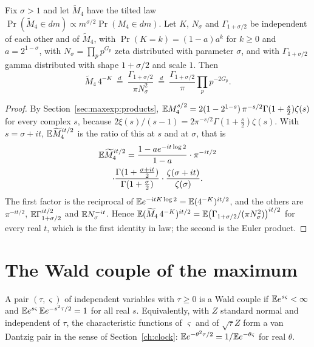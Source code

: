 \begin{theorem}\label{mw:thm:khinchin}
Fix $\sigma>1$ and let $\widetilde M_4$ have the tilted law $\Pr(\widetilde M_4\in dm)\propto m^{\sigma/2}\Pr(M_4\in dm)$. Let $K$, $N_\sigma$ and $\Gamma_{1+\sigma/2}$ be independent of each other and of $\widetilde M_4$, with $\Pr(K=k)=(1-a)a^k$ for $k\ge0$ and $a=2^{1-\sigma}$, with $N_\sigma=\prod_pp^{G_p}$ zeta distributed with parameter $\sigma$, and with $\Gamma_{1+\sigma/2}$ gamma distributed with shape $1+\sigma/2$ and scale $1$. Then
\[
\widetilde M_4\,4^{-K}\ \stackrel{d}{=}\ \frac{\Gamma_{1+\sigma/2}}{\pi N_\sigma^2}\ \stackrel{d}{=}\ \frac{\Gamma_{1+\sigma/2}}{\pi}\prod_pp^{-2G_p}.
\]
\end{theorem}

\begin{proof}
By Section~\ref{sec:maxexp:products}, $\mathbb{E} M_4^{s/2}=2(1-2^{1-s})\,\pi^{-s/2}\Gamma(1+\frac s2)\zeta(s)$ for every complex $s$, because $2\xi(s)/(s-1)=2\pi^{-s/2}\Gamma(1+\frac s2)\zeta(s)$. With $s=\sigma+it$, $\mathbb{E}\widetilde M_4^{it/2}$ is the ratio of this at $s$ and at $\sigma$, that is
\begin{multline*}
\mathbb{E}\widetilde M_4^{it/2}=\frac{1-ae^{-it\log2}}{1-a}\cdot\pi^{-it/2}\\
\cdot\frac{\Gamma(1+\frac{\sigma+it}2)}{\Gamma(1+\frac\sigma2)}\cdot\frac{\zeta(\sigma+it)}{\zeta(\sigma)}.
\end{multline*}
The first factor is the reciprocal of $\mathbb{E} e^{-itK\log2}=\mathbb{E}(4^{-K})^{it/2}$, and the others are $\pi^{-it/2}$, $\mathbb{E}\Gamma_{1+\sigma/2}^{it/2}$ and $\mathbb{E} N_\sigma^{-it}$. Hence $\mathbb{E}(\widetilde M_4\,4^{-K})^{it/2}=\mathbb{E}\bigl(\Gamma_{1+\sigma/2}/(\pi N_\sigma^2)\bigr)^{it/2}$ for every real $t$, which is the first identity in law; the second is the Euler product.
\end{proof}

\section{The Wald couple of the maximum}\label{mw:sec:wald}

\begin{definition}\label{mw:def:wald}
A pair $(\tau,\varsigma)$ of independent variables with $\tau\ge0$ is a Wald couple if $\mathbb{E} e^{s\varsigma}<\infty$ and $\mathbb{E} e^{s\varsigma}\,\mathbb{E} e^{-s^2\tau/2}=1$ for all real $s$. Equivalently, with $Z$ standard normal and independent of $\tau$, the characteristic functions of $\varsigma$ and of $\sqrt\tau Z$ form a van Dantzig pair in the sense of Section~\ref{ch:clock}: $\mathbb{E} e^{-\theta^2\tau/2}=1/\mathbb{E} e^{-\theta\varsigma}$ for real $\theta$.
\end{definition}

